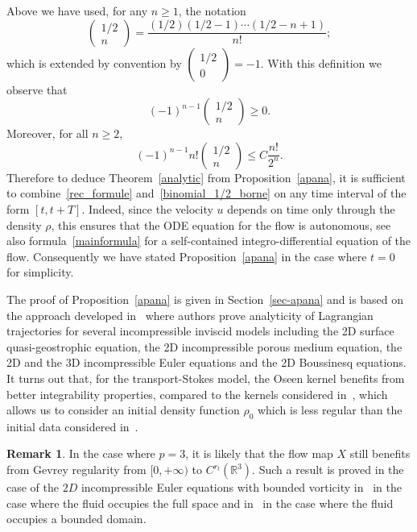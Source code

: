 \documentclass[10pt]{amsart}
\theoremstyle{definition}\newtheorem{defi}[theo]{Definition}\newtheorem{rema}[theo]{Remark}\newtheorem{exam}[theo]{Example}\newtheorem{exem}[theo]{Example}\newtheorem{nota}[theo]{Notation}
\newcommand{\R}{\mathbb{R}}
\renewcommand{\leq}{\leqslant}
\renewcommand{\geq}{\geqslant}
\begin{document}
Above we have used, for any $n\geq 1$, the notation
\begin{equation}\label{binomial_1/2}
\begin{pmatrix}
1/2\\
n
\end{pmatrix}= \frac{(1/2)(1/2-1) \cdots (1/2-n+1)}{n!};
\end{equation}
which is extended by convention by $
(\begin{smallmatrix}
1/2\\0
\end{smallmatrix})=-1$. With this definition we observe that
\[
(-1)^{n-1}
\begin{pmatrix}
1/2\\n
\end{pmatrix}\geq 0.
\]
Moreover, for all $n\geq 2$,
\begin{equation}\label{binomial_1/2_borne}
(-1)^{n-1} n!
\begin{pmatrix}
1/2\\n
\end{pmatrix} \leq C \frac{n!}{2^n}.
\end{equation}
Therefore to deduce Theorem~\ref{analytic} from Proposition~\ref{apana}, it is sufficient to combine~\eqref{rec_formule} and~\eqref{binomial_1/2_borne} on any time interval of the form $[t,t+T] $. Indeed, since the velocity $u$ depends on time only through the density $\rho$, this ensures that the ODE equation for the flow is autonomous, see also formula~\eqref{mainformula} for a self-contained integro-differential equation of the flow. Consequently we have stated Proposition~\ref{apana} in the case where $t=0$ for simplicity.

The proof of Proposition~\ref{apana} is given in Section~\ref{sec-apana} and is based on the approach developed in~\cite{CVW} where authors prove analyticity of Lagrangian trajectories for several incompressible inviscid models including the 2D surface quasi-geostrophic equation, the 2D incompressible porous medium equation, the 2D and the 3D incompressible Euler equations and the 2D Boussinesq equations. It turns out that, for the transport-Stokes model, the Oseen kernel benefits from better integrability properties, compared to the kernels considered in~\cite{CVW}, which allows us to consider an initial density function $\rho_0$ which is less regular than the initial data considered in~\cite{CVW}.

\begin{rema}\label{G3}
In the case where $p=3$, it is likely that the flow map $X$ still benefits from Gevrey regularity from $[0,+\infty)$ to $C^{r_t}(\R^3)$. Such a result is proved in the case of the $2D$ incompressible Euler equations with bounded vorticity in~\cite{Gamblin} in the case where the fluid occupies the full space and in~\cite{Sueur} in the case where the fluid occupies a bounded domain.
\end{rema}
\end{document}
